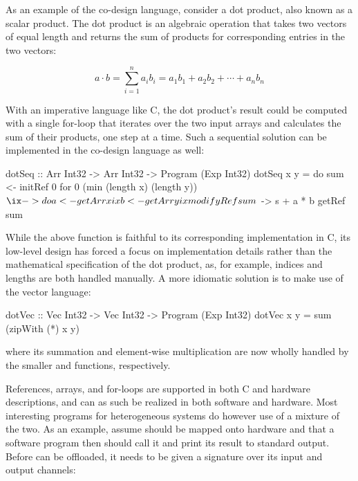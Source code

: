 \documentclass[../paper.tex]{subfiles}
\begin{document}
As an example of the co-design language, consider a dot product, also known as a scalar product. The dot product is an algebraic operation that takes two vectors of equal length and returns the sum of products for corresponding entries in the two vectors:

\begin{equation}
a \cdot b = \sum_{i=1}^{n}a_{i}b_{i} = a_{1}b_{1} + a_{2}b_{2} + \cdots + a_{n}b_{n}
\end{equation}

With an imperative language like C, the dot product's result could be computed with a single for-loop that iterates over the two input arrays and calculates the sum of their products, one step at a time. Such a sequential solution can be implemented in the co-design language as well:

\begin{code}
dotSeq :: Arr Int32 -> Arr Int32 -> Program (Exp Int32)
dotSeq x y = do
  sum <- initRef 0
  for 0 (min (length x) (length y)) $ \ix -> do
    a <- getArr x ix
    b <- getArr y ix
    modifyRef sum $ \s -> s + a * b
  getRef sum
\end{code}

While the above function is faithful to its corresponding implementation in C, its low-level design has forced a focus on implementation details rather than the mathematical specification of the dot product, as, for example, indices and lengths are both handled manually. A more idiomatic solution is to make use of the vector language:


\begin{code}
dotVec :: Vec Int32 -> Vec Int32 -> Program (Exp Int32)
dotVec x y = sum (zipWith (*) x y)
\end{code}

\noindent where its summation and element-wise multiplication are now wholly handled by the smaller  and  functions, respectively.

References, arrays, and for-loops are supported in both C and hardware descriptions, and  can as such be realized in both software and hardware. Most interesting programs for heterogeneous systems do however use of a mixture of the two. As an example, assume  should be mapped onto hardware and that a software program then should call it and print its result to standard output. Before  can be offloaded, it needs to be given a signature over its input and output channels:
\end{document}
